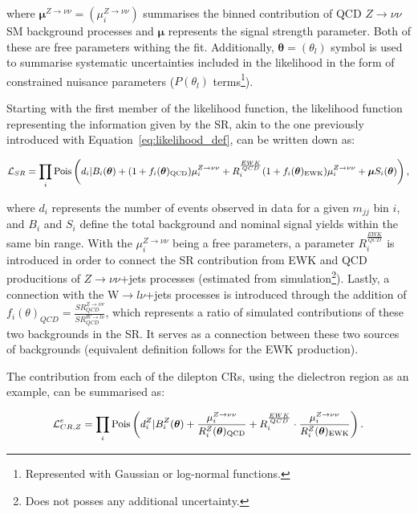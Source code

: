 where $\boldsymbol{\mu}^{Z\rightarrow \nu\nu} = (\mu_i^{Z\rightarrow \nu\nu})$ summarises the binned contribution of QCD $Z\rightarrow \nu\nu$ SM background processes and $\boldsymbol{\mu}$ represents the signal strength parameter. Both of these are free parameters withing the fit. Additionally, $\boldsymbol{\theta} = (\theta_l)$ symbol is used to summarise systematic uncertainties included in the likelihood in the form of constrained nuisance parameters ($P(\theta_l)$ terms\footnote{Represented with Gaussian or log-normal functions.}).

\hspace{10pt} Starting with the first member of the likelihood function, the likelihood function representing the information given by the SR, akin to the one previously introduced with Equation~\ref{eq:likelihood_def}, can be written down as:

\begin{equation}
 \small{\mathcal{L}_{SR} =  \prod_{i} \mathrm{Pois}\left(d_{i} | B_{i}(\boldsymbol{\theta}) + (1+f_{i}(\boldsymbol{\theta})_{\mathrm{QCD}}) \mu_{i}^{Z\rightarrow \nu\nu} + R^{\frac{EWK}{QCD}}_{i} (1+f_{i}(\boldsymbol{\theta})_{\mathrm{EWK}}) \mu_{i}^{Z\rightarrow \nu\nu}+ \boldsymbol{\mu} S_{i}(\boldsymbol{\theta})\right ),}
\end{equation}

where $d_i$ represents the number of events observed in data for a given $m_{jj}$ bin $i$, and $B_i$ and $S_i$ define the total background and nominal signal yields within the same bin range. With the $\mu_i^{Z\rightarrow \nu\nu}$ being a free parameters, a parameter $R^{\frac{EWK}{QCD}}_{i}$ is introduced in order to connect the SR contribution from EWK and QCD producitions of $Z\rightarrow \nu\nu$+jets processes (estimated from simulation\footnote{Does not posses any additional uncertainty.}). Lastly, a connection with the W$\rightarrow l\nu$+jets processes is introduced through the addition of $f_i(\theta)_{QCD} = \frac{SR^{Z\rightarrow \nu\nu}_{QCD}}{SR^{W\rightarrow l\nu}_{QCD}}$, which represents a ratio of simulated contributions of these two backgrounds in the SR. It serves as a connection between these two sources of backgrounds (equivalent definition follows for the EWK production).

\hspace{10pt} The contribution from each of the dilepton CRs, using the dielectron region as an example, can be summarised as:

\begin{equation}
\small
  \small{\mathcal{L}_{CR,Z}^{e} = \prod_{i} \mathrm{Pois} \left(d^{Z}_{i}|B^{Z}_{i}(\boldsymbol{\theta}) +\frac{\mu_i^{Z\rightarrow \nu\nu}}{R^{Z}_{i} (\boldsymbol{\theta})_{\mathrm{QCD}}} + R^{\frac{EWK}{QCD}}_{i}\cdot\frac{\mu_i^{Z\rightarrow \nu\nu} }{R^{Z}_{i} (\boldsymbol{\theta})_{\mathrm{EWK}}} \right).}
    \label{eq:likelihood_dilepton}
\end{equation}

